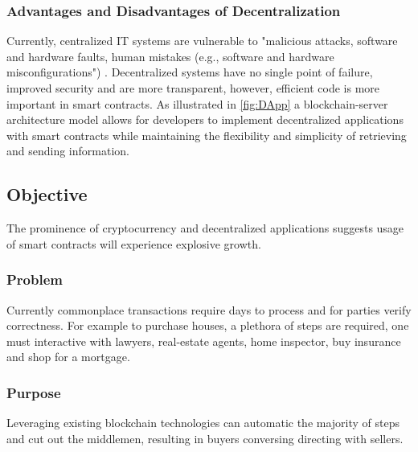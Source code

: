 	
	
	

\subsubsection{Advantages and Disadvantages of Decentralization }
Currently, centralized IT systems are vulnerable to "malicious attacks, software and hardware faults, human mistakes (e.g., software and hardware misconfigurations") \cite{5936160}. Decentralized systems have no single point of failure, improved security and are more transparent, however, efficient code is more important in smart contracts. As illustrated in \ref*{fig:DApp} a blockchain-server architecture model allows for developers to implement decentralized applications with smart contracts while maintaining the flexibility and simplicity of retrieving and sending information.	

\subsection{Objective}
The prominence of cryptocurrency and decentralized applications suggests usage of smart contracts will experience explosive growth.

\subsubsection{Problem}

Currently commonplace transactions require days to process and for parties verify correctness. For example to purchase houses, a plethora of steps are required, one must interactive with lawyers, real-estate agents, home inspector, buy insurance and shop for a mortgage. 

\subsubsection{Purpose}
Leveraging existing blockchain technologies can automatic the majority of steps and cut out the middlemen, resulting in buyers conversing directing with sellers.
